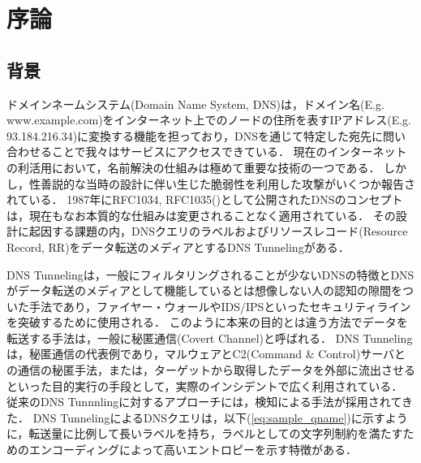 \section{序論}
\subsection{背景}
ドメインネームシステム(Domain Name System, DNS)は，ドメイン名(E.g. www.example.com)をインターネット上でのノードの住所を表すIPアドレス(E.g. 93.184.216.34)に変換する機能を担っており，DNSを通じて特定した宛先に問い合わせることで我々はサービスにアクセスできている．
現在のインターネットの利活用において，名前解決の仕組みは極めて重要な技術の一つである．
しかし，性善説的な当時の設計に伴い生じた脆弱性を利用した攻撃がいくつか報告されている．
1987年にRFC1034, RFC1035(\cite{rfc1034, rfc1035})として公開されたDNSのコンセプトは，現在もなお本質的な仕組みは変更されることなく適用されている．
その設計に起因する課題の内，DNSクエリのラベルおよびリソースレコード(Resource Record, RR)をデータ転送のメディアとするDNS Tunnelingがある．

DNS Tunnelingは，一般にフィルタリングされることが少ないDNSの特徴とDNSがデータ転送のメディアとして機能しているとは想像しない人の認知の隙間をついた手法であり，ファイヤー・ウォールやIDS/IPSといったセキュリティラインを突破するために使用される．
このように本来の目的とは違う方法でデータを転送する手法は，一般に秘匿通信(Covert Channel)と呼ばれる\cite{covertchannel}．
DNS Tunnelingは，秘匿通信の代表例であり，マルウェアとC2(Command \& Control)サーバとの通信の秘匿手法，または，ターゲットから取得したデータを外部に流出させるといった目的実行の手段として，実際のインシデントで広く利用されている\cite{frameworkpos, bondupdater, bernhardpos, multigrainpos, pisloader, denis, dnsmessenger, udpos}．
従来のDNS Tunnnlingに対するアプローチには，検知による手法が採用されてきた．
DNS TunnelingによるDNSクエリは，以下(\ref{eq:sample_qname})に示すように，転送量に比例して長いラベルを持ち，ラベルとしての文字列制約を満たすためのエンコーディングによって高いエントロピーを示す特徴がある．

